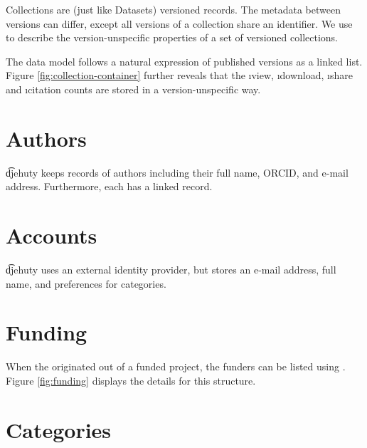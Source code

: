   Collections are (just like Datasets) versioned records.  The metadata between
  versions can differ, except all versions of a collection share an identifier.
  We use  to describe the version-unspecific
  properties of a set of versioned collections.


  The data model follows a natural expression of published versions as a
  linked list.  Figure \ref{fig:collection-container} further reveals that
  the \i{view}, \i{download}, \i{share} and \i{citation} counts are stored
  in a version-unspecific way.

\section{Authors}

  \t{djehuty} keeps records of authors including their full name, ORCID,
  and e-mail address.  Furthermore, each  has a linked
   record.


\section{Accounts}

  \t{djehuty} uses an external identity provider, but stores an e-mail address,
  full name, and preferences for categories.


\section{Funding}

  When the  originated out of a funded project, the funders
  can be listed using .  Figure \ref{fig:funding} displays
  the details for this structure.


\section{Categories}

